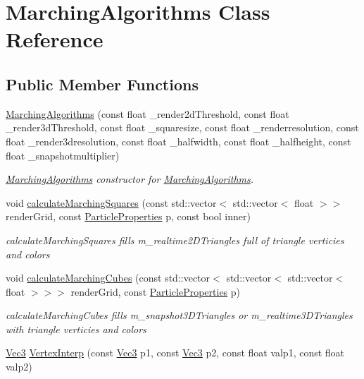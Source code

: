\hypertarget{classMarchingAlgorithms}{\section{Marching\-Algorithms Class Reference}
\label{classMarchingAlgorithms}
}
\subsection*{Public Member Functions}
\begin{DoxyCompactItemize}
\item 
\hyperlink{classMarchingAlgorithms_af884d18ba13d54b68c3148d859219a31}{Marching\-Algorithms} (const float \-\_\-render2d\-Threshold, const float \-\_\-render3d\-Threshold, const float \-\_\-squaresize, const float \-\_\-renderresolution, const float \-\_\-render3dresolution, const float \-\_\-halfwidth, const float \-\_\-halfheight, const float \-\_\-snapshotmultiplier)
\begin{DoxyCompactList}\small\item\em \hyperlink{classMarchingAlgorithms}{Marching\-Algorithms} constructor for \hyperlink{classMarchingAlgorithms}{Marching\-Algorithms}. \end{DoxyCompactList}\item 
void \hyperlink{classMarchingAlgorithms_a0b6fb536f84f8cd573110c8568d8978f}{calculate\-Marching\-Squares} (const std\-::vector$<$ std\-::vector$<$ float $>$$>$ render\-Grid, const \hyperlink{classParticleProperties}{Particle\-Properties} p, const bool inner)
\begin{DoxyCompactList}\small\item\em calculate\-Marching\-Squares fills m\-\_\-realtime2\-D\-Triangles full of triangle verticies and colors \end{DoxyCompactList}\item 
void \hyperlink{classMarchingAlgorithms_ad3ea84f528558c3057eb71598ace118a}{calculate\-Marching\-Cubes} (const std\-::vector$<$ std\-::vector$<$ std\-::vector$<$ float $>$$>$$>$ render\-Grid, const \hyperlink{classParticleProperties}{Particle\-Properties} p)
\begin{DoxyCompactList}\small\item\em calculate\-Marching\-Cubes fills m\-\_\-snapshot3\-D\-Triangles or m\-\_\-realtime3\-D\-Triangles with triangle verticies and colors \end{DoxyCompactList}\item 
\hyperlink{classVec3}{Vec3} \hyperlink{classMarchingAlgorithms_afe2a91dcd2b7948e0980acd2f2a73322}{Vertex\-Interp} (const \hyperlink{classVec3}{Vec3} p1, const \hyperlink{classVec3}{Vec3} p2, const float valp1, const float valp2)
$$
\end{DoxyCompactItemize}
